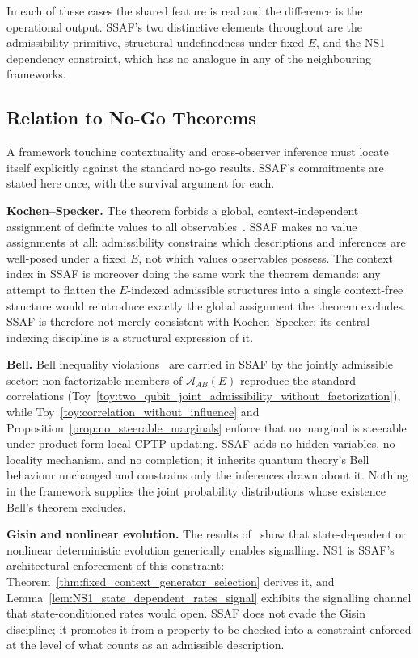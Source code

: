 \documentclass[aps,prx,onecolumn,11pt]{revtex4-2}
\theoremstyle{plain}
\theoremstyle{definition}
\theoremstyle{remark}
\begin{document}
In each of these cases the shared feature is real and the difference is
the operational output. SSAF's two distinctive elements throughout are
the admissibility primitive, structural undefinedness under fixed $E$,
and the NS1 dependency constraint, which has no analogue in any of the
neighbouring frameworks.

\subsection{Relation to No-Go Theorems}
\label{subsec:nogo_audit}

A framework touching contextuality and cross-observer inference must
locate itself explicitly against the standard no-go results. SSAF's
commitments are stated here once, with the survival argument for each.

\textbf{Kochen--Specker.}
The theorem forbids a global, context-independent assignment of
definite values to all observables~\cite{KochenSpecker1967,
AbramskyBrandenburger2011}. SSAF makes no value assignments at all:
admissibility constrains which descriptions and inferences are
well-posed under a fixed \(E\), not which values observables possess.
The context index in SSAF is moreover doing the same work the theorem
demands: any attempt to flatten the \(E\)-indexed admissible structures
into a single context-free structure would reintroduce exactly the
global assignment the theorem excludes. SSAF is therefore not merely
consistent with Kochen--Specker; its central indexing discipline is a
structural expression of it.

\textbf{Bell.}
Bell inequality violations~\cite{Bell1964} are carried in SSAF by the
jointly admissible sector: non-factorizable members of
\(\mathcal A_{AB}(E)\) reproduce the standard correlations
(Toy~\ref{toy:two_qubit_joint_admissibility_without_factorization}),
while Toy~\ref{toy:correlation_without_influence} and
Proposition~\ref{prop:no_steerable_marginals} enforce that no marginal
is steerable under product-form local CPTP updating. SSAF adds no
hidden variables, no locality mechanism, and no completion; it inherits
quantum theory's Bell behaviour unchanged and constrains only the
inferences drawn about it. Nothing in the framework supplies the joint
probability distributions whose existence Bell's theorem excludes.

\textbf{Gisin and nonlinear evolution.}
The results of~\cite{Gisin1989,Gisin1990,Polchinski1991} show that
state-dependent or nonlinear deterministic evolution generically
enables signalling. NS1 is SSAF's architectural enforcement of this
constraint: Theorem~\ref{thm:fixed_context_generator_selection} derives
it, and Lemma~\ref{lem:NS1_state_dependent_rates_signal} exhibits the
signalling channel that state-conditioned rates would open. SSAF does
not evade the Gisin discipline; it promotes it from a property to be
checked into a constraint enforced at the level of what counts as an
admissible description.
\end{document}

